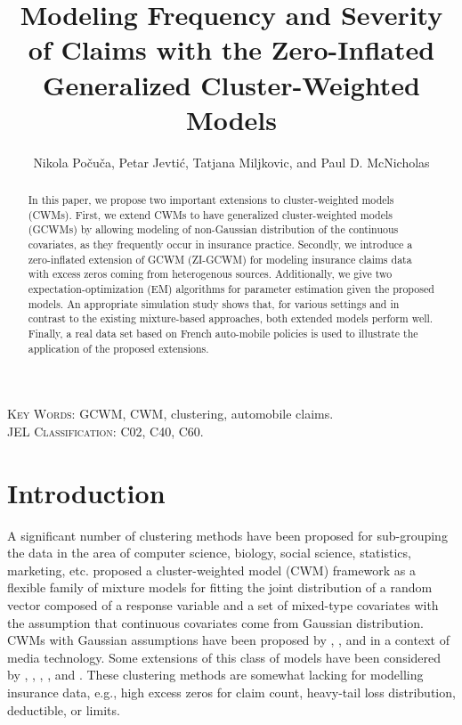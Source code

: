\documentclass[12pt,letterpaper]{article}
\numberwithin{equation}{section}
\numberwithin{equation}{section}
\numberwithin{equation}{section}
\begin{document}
\title{Modeling  Frequency and Severity of Claims with the Zero-Inflated Generalized  Cluster-Weighted Models}

\author{Nikola Po\v cu\v ca,  Petar Jevti\' c, Tatjana Miljkovic, and Paul D. McNicholas}

\maketitle
\doublespacing
\small

\begin{abstract}

In this paper, we propose two important extensions to cluster-weighted models (CWMs). First, we extend CWMs to have generalized cluster-weighted models (GCWMs) by allowing modeling of non-Gaussian distribution of the continuous covariates, as they frequently occur in insurance practice. Secondly, we introduce a zero-inflated extension of GCWM (ZI-GCWM) for modeling insurance claims data with excess zeros coming from heterogenous sources. Additionally, we give two expectation-optimization (EM) algorithms for parameter estimation given the proposed models. An appropriate simulation study shows that, for various settings and in contrast to the existing mixture-based approaches, both extended models perform well. Finally, a real data set based on French auto-mobile policies is used to illustrate the application of the proposed extensions.

\end{abstract}
\textsc{Key Words:} GCWM, CWM, clustering, automobile claims.\\
\textsc{JEL Classification:}  C02, C40, C60.\\
\section{Introduction}\label{sec:introduction}
A significant number of clustering methods have been proposed for sub-grouping the data in the area of computer science, biology, social science, statistics, marketing, etc. \cite{Ingrassia+Punzo+Vittadini+Minotti:2015} proposed a cluster-weighted model (CWM) framework as a flexible family of mixture models for fitting the joint distribution of a random vector composed of a response variable and a set of mixed-type covariates with the assumption that continuous covariates come from Gaussian distribution. CWMs with Gaussian assumptions have been proposed by \cite{Gershenfeld:1997}, \cite{Gershenfeld:Schoner+Metois:1999}, and \cite{Gershenfeld:1999} in a context of media technology. Some extensions of this class of models have been considered by \cite{Punzo+Ingrassia:2015}, \cite{Ingrassia+Minotti+Punzo:2014}, \cite{Ingrassia+Minotti+Vittadini:2012}, \cite{subedi13,subedi15}, and \cite{punzo17}. These clustering methods are somewhat lacking for modelling insurance data, e.g., high excess zeros for claim count, heavy-tail loss distribution, deductible, or limits.
\end{document}
